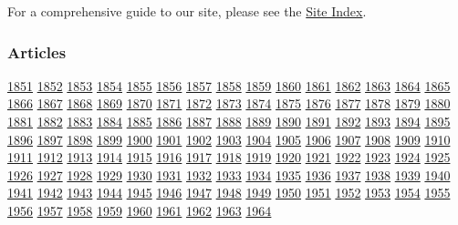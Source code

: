 For a comprehensive guide to our site, please see the
\href{http://www.nytimes3xbfgragh.onion/ref/membercenter/help/siteindex.html}{Site
Index}.

\hypertarget{articles}{%
\subsubsection{Articles}\label{articles}}

\href{1851/}{1851} \href{1852/}{1852} \href{1853/}{1853}
\href{1854/}{1854} \href{1855/}{1855} \href{1856/}{1856}
\href{1857/}{1857} \href{1858/}{1858} \href{1859/}{1859}
\href{1860/}{1860} \href{1861/}{1861} \href{1862/}{1862}
\href{1863/}{1863} \href{1864/}{1864} \href{1865/}{1865}
\href{1866/}{1866} \href{1867/}{1867} \href{1868/}{1868}
\href{1869/}{1869} \href{1870/}{1870} \href{1871/}{1871}
\href{1872/}{1872} \href{1873/}{1873} \href{1874/}{1874}
\href{1875/}{1875} \href{1876/}{1876} \href{1877/}{1877}
\href{1878/}{1878} \href{1879/}{1879} \href{1880/}{1880}
\href{1881/}{1881} \href{1882/}{1882} \href{1883/}{1883}
\href{1884/}{1884} \href{1885/}{1885} \href{1886/}{1886}
\href{1887/}{1887} \href{1888/}{1888} \href{1889/}{1889}
\href{1890/}{1890} \href{1891/}{1891} \href{1892/}{1892}
\href{1893/}{1893} \href{1894/}{1894} \href{1895/}{1895}
\href{1896/}{1896} \href{1897/}{1897} \href{1898/}{1898}
\href{1899/}{1899} \href{1900/}{1900} \href{1901/}{1901}
\href{1902/}{1902} \href{1903/}{1903} \href{1904/}{1904}
\href{1905/}{1905} \href{1906/}{1906} \href{1907/}{1907}
\href{1908/}{1908} \href{1909/}{1909} \href{1910/}{1910}
\href{1911/}{1911} \href{1912/}{1912} \href{1913/}{1913}
\href{1914/}{1914} \href{1915/}{1915} \href{1916/}{1916}
\href{1917/}{1917} \href{1918/}{1918} \href{1919/}{1919}
\href{1920/}{1920} \href{1921/}{1921} \href{1922/}{1922}
\href{1923/}{1923} \href{1924/}{1924} \href{1925/}{1925}
\href{1926/}{1926} \href{1927/}{1927} \href{1928/}{1928}
\href{1929/}{1929} \href{1930/}{1930} \href{1931/}{1931}
\href{1932/}{1932} \href{1933/}{1933} \href{1934/}{1934}
\href{1935/}{1935} \href{1936/}{1936} \href{1937/}{1937}
\href{1938/}{1938} \href{1939/}{1939} \href{1940/}{1940}
\href{1941/}{1941} \href{1942/}{1942} \href{1943/}{1943}
\href{1944/}{1944} \href{1945/}{1945} \href{1946/}{1946}
\href{1947/}{1947} \href{1948/}{1948} \href{1949/}{1949}
\href{1950/}{1950} \href{1951/}{1951} \href{1952/}{1952}
\href{1953/}{1953} \href{1954/}{1954} \href{1955/}{1955}
\href{1956/}{1956} \href{1957/}{1957} \href{1958/}{1958}
\href{1959/}{1959} \href{1960/}{1960} \href{1961/}{1961}
\href{1962/}{1962} \href{1963/}{1963} \href{1964/}{1964}
